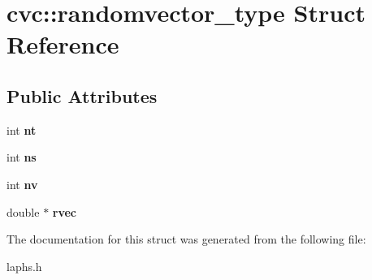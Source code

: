 \hypertarget{structcvc_1_1randomvector__type}{\section{cvc\-:\-:randomvector\-\_\-type Struct Reference}
\label{structcvc_1_1randomvector__type}
}
\subsection*{Public Attributes}
\begin{DoxyCompactItemize}
\item 
\hypertarget{structcvc_1_1randomvector__type_a68ce8eb932c9db73e2fb46f3c760023e}{int {\bfseries nt}}\label{structcvc_1_1randomvector__type_a68ce8eb932c9db73e2fb46f3c760023e}

\item 
\hypertarget{structcvc_1_1randomvector__type_a346de315d4a9cf902699cc0cc24eaac9}{int {\bfseries ns}}\label{structcvc_1_1randomvector__type_a346de315d4a9cf902699cc0cc24eaac9}

\item 
\hypertarget{structcvc_1_1randomvector__type_ac79a77898f4fd164089244f686f50a86}{int {\bfseries nv}}\label{structcvc_1_1randomvector__type_ac79a77898f4fd164089244f686f50a86}

\item 
\hypertarget{structcvc_1_1randomvector__type_aab5c47b6e3acc1e0577dc0cebc6b403a}{double $\ast$ {\bfseries rvec}}\label{structcvc_1_1randomvector__type_aab5c47b6e3acc1e0577dc0cebc6b403a}

\end{DoxyCompactItemize}


The documentation for this struct was generated from the following file\-:\begin{DoxyCompactItemize}
\item 
laphs.\-h\end{DoxyCompactItemize}

